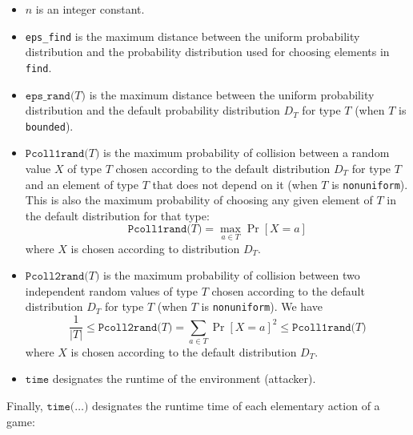 \begin{itemize}
\item $n$ is an integer constant.

\item \texttt{eps\_find} is the maximum distance between the uniform probability
distribution and the probability distribution used for choosing elements
in {\tt find}.

\item $\texttt{eps\_rand(}T\texttt{)}$ is the maximum distance between the 
uniform probability distribution and the default probability distribution 
$D_T$ for type $T$ (when $T$ is \texttt{bounded}).

\item 
$\texttt{Pcoll1rand(}T\texttt{)}$ is the maximum probability of
collision between a random value $X$ of type $T$ chosen according
to the default distribution $D_T$ for type $T$ and an element of type $T$
that does not depend on it (when $T$ is \texttt{nonuniform}).
This is also the maximum probability of choosing any given element of 
$T$ in the default distribution for that type:
\[\texttt{Pcoll1rand(}T\texttt{)} = \max_{a \in T} \Pr[X = a]\]
where $X$ is chosen according to distribution $D_T$.

\item $\texttt{Pcoll2rand(}T\texttt{)}$ is the maximum probability of
collision between two independent random values of type $T$  
chosen according to the default distribution $D_T$ for type $T$
(when $T$ is \texttt{nonuniform}). We have
\[\frac{1}{|T|} \leq \texttt{Pcoll2rand(}T\texttt{)} = \sum_{a \in T} \Pr[X = a]^2 \leq \texttt{Pcoll1rand(}T\texttt{)}\]
where $X$ is chosen according to the default distribution $D_T$.

\item $\texttt{time}$ designates the runtime of the environment (attacker).

\end{itemize}
Finally, $\texttt{time(}\ldots\texttt{)}$ designates the runtime time of each
elementary action of a game:
